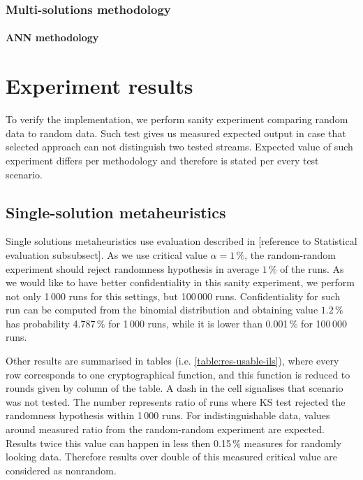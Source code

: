 \documentclass[
  print, %
  Table,   %
  nolof,     %
  nolot,     %
  11pt, %
  oneside  %
]{fithesis3}
\begin{document}
\subsection{Multi-solutions methodology}
\label{subsec:method-spec-ms}
\subsubsection{ANN methodology}
\label{subsubsec:method-spec-ms-aco}

\chapter{Experiment results}
\label{chap:res}

To verify the implementation, we perform sanity experiment comparing random data to random data. Such test gives us measured expected output in case that selected approach can not distinguish two tested streams. Expected value of such experiment differs per methodology and therefore is stated per every test scenario.

\section{Single-solution metaheuristics}
\label{sec:res-ss}


Single solutions metaheuristics use evaluation described in [reference to Statistical evaluation subsubsect]. As we use critical value $\alpha=1\,\%$, the random-random experiment should reject randomness hypothesis in average $1\,\%$ of the runs. As we would like to have better confidentiality in this sanity experiment, we perform not only 1\,000 runs for this settings, but 100\,000 runs. Confidentiality for such run can be computed from the binomial distribution and obtaining value $1.2\,\%$ has probability 4.787\,\% for 1\,000 runs, while it is lower than 0.001\,\% for 100\,000 runs.

Other results are summarised in tables (i.e. \cref{table:res-usable-ils}), where every row corresponds to one cryptographical function, and this function is reduced to rounds given by column of the table. A dash in the cell signalises that scenario was not tested. The number represents ratio of runs where KS test rejected the randomness hypothesis within 1\,000 runs. For indistinguishable data, values around measured ratio from the random-random experiment are expected. Results twice this value can happen in less then 0.15\,\% measures for randomly looking data. Therefore results over double of this measured critical value are considered as nonrandom.
\end{document}
